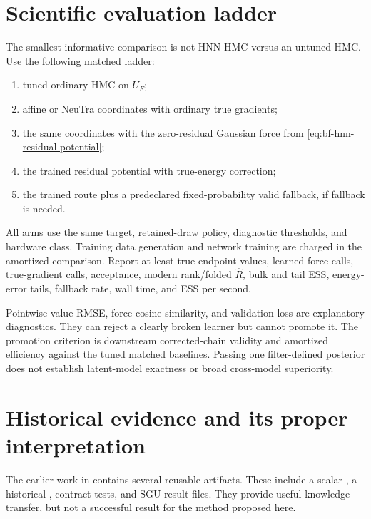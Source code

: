 \section{Scientific evaluation ladder}
\label{sec:bf-hnn-evaluation}

The smallest informative comparison is not HNN-HMC versus an untuned HMC.  Use
the following matched ladder:
\begin{enumerate}
 \item tuned ordinary HMC on $U_F$;
 \item affine or NeuTra coordinates with ordinary true gradients;
 \item the same coordinates with the zero-residual Gaussian force from
 \eqref{eq:bf-hnn-residual-potential};
 \item the trained residual potential with true-energy correction;
 \item the trained route plus a predeclared fixed-probability valid fallback,
 if fallback is needed.
\end{enumerate}
All arms use the same target, retained-draw policy, diagnostic thresholds, and
hardware class.  Training data generation and network training are charged in
the amortized comparison.  Report at least true endpoint values, learned-force
calls, true-gradient calls, acceptance, modern rank/folded $\widehat R$, bulk
and tail ESS, energy-error tails, fallback rate, wall time, and ESS per second.

Pointwise value RMSE, force cosine similarity, and validation loss are
explanatory diagnostics.  They can reject a clearly broken learner but cannot
promote it.  The promotion criterion is downstream corrected-chain validity
and amortized efficiency against the tuned matched baselines.  Passing one
filter-defined posterior does not establish latent-model exactness or broad
cross-model superiority.

\section{Historical evidence and its proper interpretation}
\label{sec:bf-hnn-historical-evidence}

The earlier work in  contains several reusable
artifacts.  These include a scalar , a
historical , contract tests, and SGU result files.
They provide useful knowledge transfer, but not a successful result for the
method proposed here.

